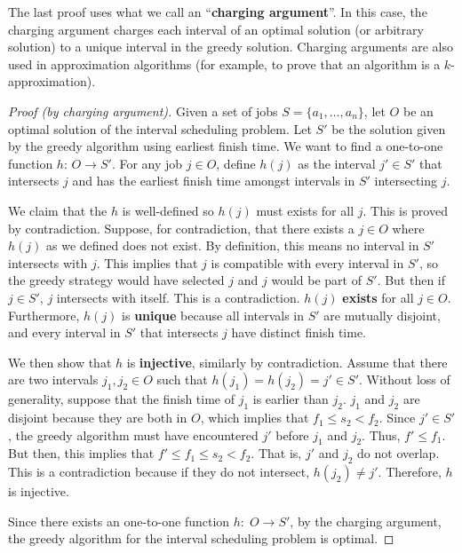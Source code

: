 The last proof uses what we call an ``\textbf{charging argument}''. In this case, the charging argument charges each interval of an optimal solution (or arbitrary solution) to a unique interval in the greedy solution. Charging arguments are also used in approximation algorithms (for example, to prove that an algorithm is a $k$-approximation).

\begin{proof}[Proof (by charging argument)] 
    Given a set of jobs $S = \{a_1,\ldots,a_n\}$, let $O$ be an optimal solution of the interval scheduling problem. Let $S'$ be the solution given by the greedy algorithm using earliest finish time. We want to find a one-to-one function $h:\, O \to S'$. For any job $j \in O$, define $h(j)$ as the interval $j' \in S'$ that intersects $j$ and has the earliest finish time amongst intervals in $S'$ intersecting $j$.

    We claim that the $h$ is well-defined so $h(j)$ must exists for all $j$. This is proved by contradiction. Suppose, for contradiction, that there exists a $j \in O$ where $h(j)$ as we defined does not exist. By definition, this means no interval in $S'$ intersects with $j$. This implies that $j$ is compatible with every interval in $S'$, so the greedy strategy would have selected $j$ and $j$ would be part of $S'$. But then if $j \in S'$, $j$ intersects with itself. This is a contradiction. $h(j)$ \textbf{exists} for all $j \in O$. Furthermore, $h(j)$ is \textbf{unique} because all intervals in $S'$ are mutually disjoint, and every interval in $S'$ that intersects $j$ have distinct finish time.

    We then show that $h$ is \textbf{injective}, similarly by contradiction. Assume that there are two intervals $j_1,j_2 \in O$ such that $h(j_1) = h(j_2) = j' \in S'$. Without loss of generality, suppose that the finish time of $j_1$ is earlier than $j_2$. $j_1$ and $j_2$ are disjoint because they are both in $O$, which implies that $f_1 \leq s_2 < f_2$. Since $j' \in S'$, the greedy algorithm must have encountered $j'$ before $j_1$ and $j_2$. Thus, $f' \leq f_1$. But then, this implies that $f' \leq f_1 \leq s_2 < f_2$. That is, $j'$ and $j_2$ do not overlap. This is a contradiction because if they do not intersect, $h(j_2) \neq j'$. Therefore, $h$ is injective.
    
    Since there exists an one-to-one function $h:\; O \to S'$, by the charging argument, the greedy algorithm for the interval scheduling problem is optimal.
\end{proof}

